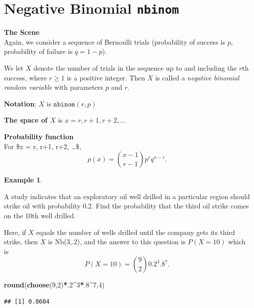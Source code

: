 \documentclass[
]{book}
\newenvironment{Shaded}{\begin{snugshade}}{\end{snugshade}}
\newcommand{\DecValTok}[1]{\textcolor[rgb]{0.00,0.00,0.81}{#1}}
\newcommand{\FunctionTok}[1]{\textcolor[rgb]{0.13,0.29,0.53}{\textbf{#1}}}
\newcommand{\NormalTok}[1]{#1}
\newcommand{\SpecialCharTok}[1]{\textcolor[rgb]{0.81,0.36,0.00}{\textbf{#1}}}
\theoremstyle{definition}
\theoremstyle{definition}
\newtheorem{example}{Example}[chapter]
\theoremstyle{definition}
\theoremstyle{definition}
\theoremstyle{remark}
\begin{document}
\section{\texorpdfstring{Negative Binomial \texttt{nbinom}}{Negative Binomial nbinom}}\label{negbinomR}

\textbf{The Scene}\\
Again, we consider a sequence of Bernoulli trials (probability of success is \(p\), probability of failure is \(q = 1-p\)).

We let \(X\) denote the number of trials in the sequence up to and including the \(r\)th success, where \(r \geq 1\) is a positive integer. Then \(X\) is called a \emph{negative binomial random variable} with parameters \(p\) and \(r\).

\textbf{Notation}: \(X\) is \(\texttt{nbinom}(r,p)\)

\textbf{The space of \(X\)} is \(x = r, r+1, r+2, \ldots\)

\textbf{Probability function}\\
For \$x = r, r+1, r+2, \ldots \$, \[p(x)= \binom{x-1}{r-1}p^{r}q^{x-r}.\]

\begin{example}
\protect\hypertarget{exm:drill-oil-negbinom-R}{}\label{exm:drill-oil-negbinom-R}

A study indicates that an exploratory oil well drilled in a particular region should strike oil with probability 0.2. Find the probability that the third oil strike comes on the 10th well drilled.

Here, if \(X\) equals the number of wells drilled until the company gets its third strike, then \(X\) is Nb(3,.2), and the answer to this question is \(P(X=10)\) which is \[P(X=10)=\binom{9}{2}0.2^{3}.8^{7}.\]

\begin{Shaded}
\begin{Highlighting}[]
\FunctionTok{round}\NormalTok{(}\FunctionTok{choose}\NormalTok{(}\DecValTok{9}\NormalTok{,}\DecValTok{2}\NormalTok{)}\SpecialCharTok{*}\NormalTok{.}\DecValTok{2}\SpecialCharTok{\^{}}\DecValTok{3}\SpecialCharTok{*}\NormalTok{.}\DecValTok{8}\SpecialCharTok{\^{}}\DecValTok{7}\NormalTok{,}\DecValTok{4}\NormalTok{)}
\end{Highlighting}
\end{Shaded}

\begin{verbatim}
## [1] 0.0604
\end{verbatim}

\end{example}
\end{document}
